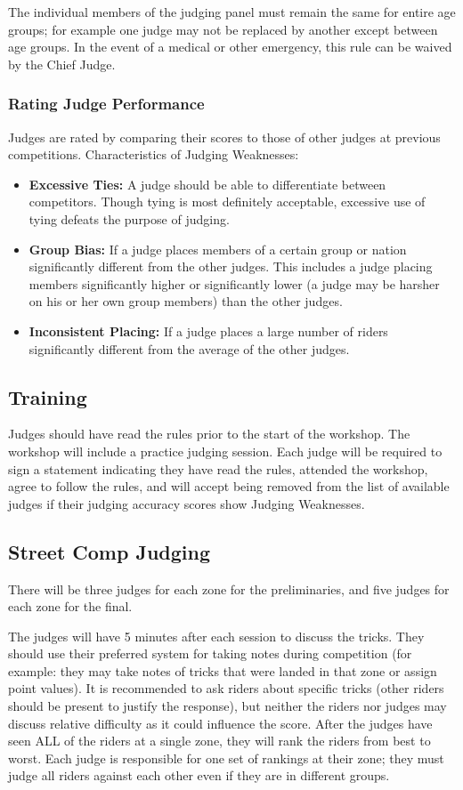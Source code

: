 The individual members of the judging panel must remain the same for entire age groups; for example one judge may not be replaced by another except between age groups.
In the event of a medical or other emergency, this rule can be waived by the Chief Judge.

\subsubsection{Rating Judge Performance}
Judges are rated by comparing their scores to those of other judges at previous competitions.
Characteristics of Judging Weaknesses:
\begin{itemize}
\item \textbf{Excessive Ties:}
A judge should be able to differentiate between competitors.
Though tying is most definitely acceptable, excessive use of tying defeats the purpose of judging.
\item \textbf{Group Bias:}
If a judge places members of a certain group or nation significantly different from the other judges.
This includes a judge placing members significantly higher or significantly lower (a judge may be harsher on his or her own group members) than the other judges.
\item\textbf{Inconsistent Placing:}
If a judge places a large number of riders significantly different from the average of the other judges.
\end{itemize}

\subsection{Training}
Judges should have read the rules prior to the start of the workshop.
The workshop will include a practice judging session.
Each judge will be required to sign a statement indicating they have read the rules, attended the workshop, agree to follow the rules, and will accept being removed from the list of available judges if their judging accuracy scores show Judging Weaknesses.

\subsection{Street Comp Judging}
There will be three judges for each zone for the preliminaries, and five judges for each zone for the final.

The judges will have 5 minutes after each session to discuss the tricks.
They should use their preferred system for taking notes during competition (for example: they may take notes of tricks that were landed in that zone or assign point values).
It is recommended to ask riders about specific tricks (other riders should be present to justify the response), but neither the riders nor judges may discuss relative difficulty as it could influence the score.
After the judges have seen ALL of the riders at a single zone, they will rank the riders from best to worst.
Each judge is responsible for one set of rankings at their zone; they must judge all riders against each other even if they are in different groups.

